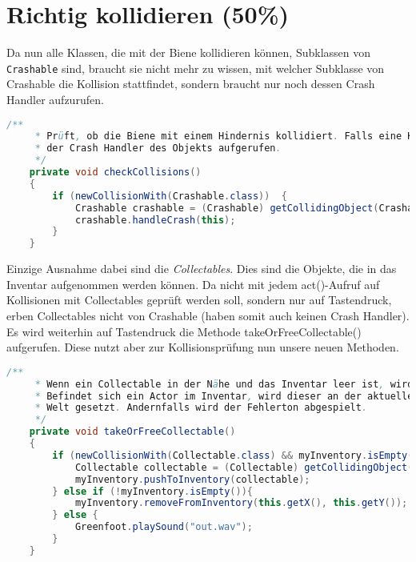 \documentclass{pi1}
\begin{document}
\section{Richtig kollidieren (50\%)}

Da nun alle Klassen, die mit der Biene kollidieren können, Subklassen von \texttt{Crashable} sind, braucht sie nicht mehr zu wissen, mit welcher Subklasse von Crashable die Kollision stattfindet, sondern braucht nur noch dessen Crash Handler aufzurufen.

\begin{lstlisting}[caption={\emph{checkCollisions()}-Methode}, firstnumber=156, language=Java]
/**
     * Prüft, ob die Biene mit einem Hindernis kollidiert. Falls eine Kollision existiert, wird
     * der Crash Handler des Objekts aufgerufen.
     */
    private void checkCollisions()
    {
        if (newCollisionWith(Crashable.class))  {
            Crashable crashable = (Crashable) getCollidingObject(Crashable.class);
            crashable.handleCrash(this);
        }
    }
\end{lstlisting}

Einzige Ausnahme dabei sind die \emph{Collectables}. Dies sind die Objekte, die in das Inventar aufgenommen werden können. Da nicht mit jedem act()-Aufruf auf Kollisionen mit Collectables geprüft werden soll, sondern nur auf Tastendruck, erben Collectables nicht von Crashable (haben somit auch keinen Crash Handler). Es wird weiterhin auf Tastendruck die Methode takeOrFreeCollectable() aufgerufen. Diese nutzt aber zur Kollisionsprüfung nun unsere neuen Methoden.

\begin{lstlisting}[caption={\emph{takeOrFreeCollectable()}-Methode}, firstnumber=168, language=Java]
/**
     * Wenn ein Collectable in der Nähe und das Inventar leer ist, wird das Collectable eingesammelt.
     * Befindet sich ein Actor im Inventar, wird dieser an der aktuellen Position der Biene in die
     * Welt gesetzt. Andernfalls wird der Fehlerton abgespielt.
     */
    private void takeOrFreeCollectable()
    {
        if (newCollisionWith(Collectable.class) && myInventory.isEmpty() ){
            Collectable collectable = (Collectable) getCollidingObject(Collectable.class);
            myInventory.pushToInventory(collectable);
        } else if (!myInventory.isEmpty()){
            myInventory.removeFromInventory(this.getX(), this.getY());
        } else {
            Greenfoot.playSound("out.wav");
        }
    }
\end{lstlisting}
\end{document}
